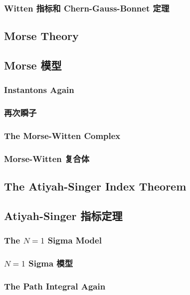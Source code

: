 \documentclass{article}
\begin{document}
\begin{paracol}{2}
\subsubsection*{Witten 指标和 Chern-Gauss-Bonnet 定理}
\switchcolumn*

\subsection{Morse Theory}
\switchcolumn
\subsection*{Morse 模型}
\switchcolumn*

\subsubsection{Instantons Again}
\switchcolumn
\subsubsection*{再次瞬子}
\switchcolumn*

\subsubsection{The Morse-Witten Complex}
\switchcolumn
\subsubsection*{Morse-Witten 复合体}
\switchcolumn*

\subsection{The Atiyah-Singer Index Theorem}
\switchcolumn
\subsection*{Atiyah-Singer 指标定理}
\switchcolumn*

\subsubsection{The $N = 1$ Sigma Model}
\switchcolumn
\subsubsection*{$N = 1$ Sigma 模型}
\switchcolumn*

\subsubsection{The Path Integral Again}
\switchcolumn

\end{paracol}
\end{document}
